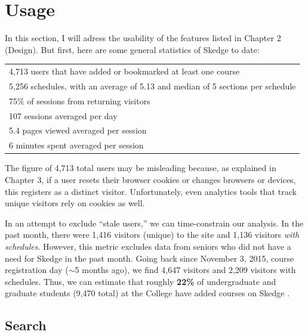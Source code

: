 
\section{Usage}

In this section, I will adress the usability of the features listed in Chapter 2 (Design). But first, here are some general statistics of Skedge to date:

\vspace{7pt}

\onehalfspacing
\begin{center}
\begin{tabular}{l}
  \hline
  4,713 users that have added or bookmarked at least one course \\ 
  5,256 schedules, with an average of 5.13 and median of 5 sections per schedule \\ 
  75\% of sessions from returning visitors \\ 
  107 sessions averaged per day \\ 
  5.4 pages viewed averaged per session  \\ 
  6 minutes spent averaged per session \\ 
  \hline
\end{tabular}
\end{center}
\doublespacing

\noindent The figure of 4,713 total users may be misleading because, as explained in Chapter 3, if a user resets their browser cookies or changes browsers or devices, this registers as a distinct visitor. Unfortunately, even analytics tools that track unique visitors rely on cookies as well.

In an attempt to exclude ``stale users,'' we can time-constrain our analysis. In the past month, there were 1,416 visitors (unique) to the site and 1,136 visitors \emph{with schedules}. However, this metric excludes data from seniors who did not have a need for Skedge in the past month. Going back since November 3, 2015, course registration day ($\sim$5 months ago), we find 4,647 visitors and 2,209 visitors with schedules. Thus, we can estimate that roughly \textbf{22\%} of undergraduate and graduate students (9,470 total) at the College have added courses on Skedge \cite{undergrads}.

\subsection{Search}

